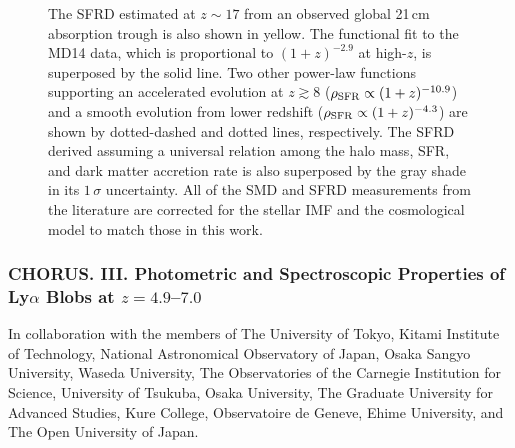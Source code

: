 \begin{figure}
{The SFRD estimated at $z \sim 17$ from an observed global 21\,cm absorption trough 
is also shown in yellow. 
The functional fit to the MD14 data, which is proportional to $(1 + z)^{-2.9}$ at high-$z$,  
is superposed by the solid line. 
Two other power-law functions supporting an accelerated evolution at $z \gtrsim 8$ 
($\rho_{\rm SFR} \propto (1+z)^{-10.9}$)
and a smooth evolution from lower redshift ($\rho_{\rm SFR} \propto (1+z)^{-4.3}$)
are shown by dotted-dashed and dotted lines, respectively. 
The SFRD derived assuming a universal relation among the halo mass, SFR, and dark matter accretion rate 
is also superposed by the gray shade in its $1\,\sigma$ uncertainty. 
All of the SMD and SFRD measurements from the literature are corrected for the stellar IMF 
and the cosmological model to match those in this work. 
}
\label{cos:Mawatari2020_fig13}
\end{figure}








\subsubsection*{\bi
CHORUS. III. Photometric and Spectroscopic Properties of Ly$\alpha$ Blobs at $z = 4.9$--$7.0$
{\rm \cite{zhang2020}}
}

\vspace{3pt}

\noindent
In collaboration with the members of
\noindent
The University of Tokyo, 
Kitami Institute of Technology, 
National Astronomical Observatory of Japan, 
Osaka Sangyo University, 
Waseda University, 
The Observatories of the Carnegie Institution for Science, 
University of Tsukuba, 
Osaka University, 
The Graduate University for Advanced Studies, 
Kure College, 
Observatoire de Geneve, 
Ehime University, 
and 
The Open University of Japan. 

\vspace{10pt}

